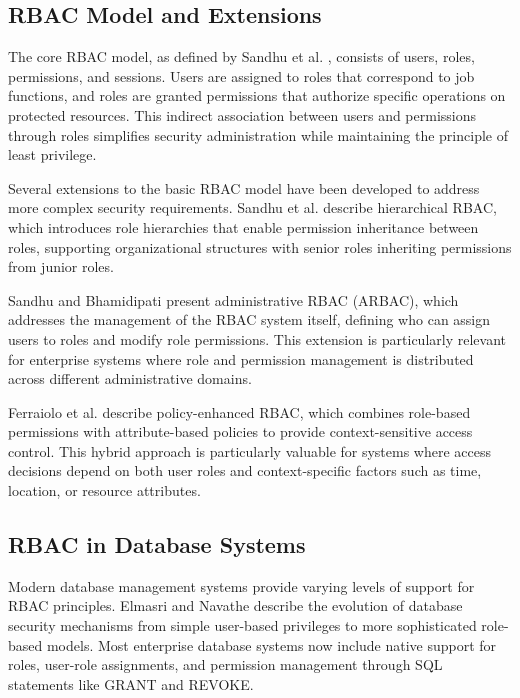 \subsection{RBAC Model and Extensions}
\label{subsec:rbac-model-extensions}

The core RBAC model, as defined by Sandhu et al. \cite{sandhu1998role}, consists of users, roles, permissions, and sessions. Users are assigned to roles that correspond to job functions, and roles are granted permissions that authorize specific operations on protected resources. This indirect association between users and permissions through roles simplifies security administration while maintaining the principle of least privilege.

Several extensions to the basic RBAC model have been developed to address more complex security requirements. Sandhu et al. \cite{sandhu1998role} describe hierarchical RBAC, which introduces role hierarchies that enable permission inheritance between roles, supporting organizational structures with senior roles inheriting permissions from junior roles.

Sandhu and Bhamidipati \cite{sandhu1997arbac97} present administrative RBAC (ARBAC), which addresses the management of the RBAC system itself, defining who can assign users to roles and modify role permissions. This extension is particularly relevant for enterprise systems where role and permission management is distributed across different administrative domains.

Ferraiolo et al. \cite{ferraiolo2011policy} describe policy-enhanced RBAC, which combines role-based permissions with attribute-based policies to provide context-sensitive access control. This hybrid approach is particularly valuable for systems where access decisions depend on both user roles and context-specific factors such as time, location, or resource attributes.

\subsection{RBAC in Database Systems}
\label{subsec:rbac-database-systems}

Modern database management systems provide varying levels of support for RBAC principles. Elmasri and Navathe \cite{elmasri2015fundamentals} describe the evolution of database security mechanisms from simple user-based privileges to more sophisticated role-based models. Most enterprise database systems now include native support for roles, user-role assignments, and permission management through SQL statements like GRANT and REVOKE.

